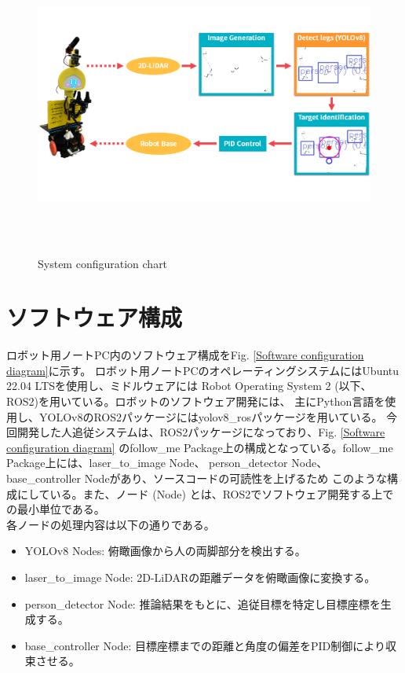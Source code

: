 \begin{figure}[h]
    \begin{center}
    \includegraphics[height=100mm,clip]{figure/System-configration-chart.png}
    \caption{System configuration chart}
    \label{System configuration chart}
    \end{center}
\end{figure}

\section{ソフトウェア構成}
ロボット用ノートPC内のソフトウェア構成をFig. \ref{Software configuration diagram}に示す。
ロボット用ノートPCのオペレーティングシステムにはUbuntu 22.04 LTSを使用し、ミドルウェアには
Robot Operating System 2 (以下、ROS2)を用いている。ロボットのソフトウェア開発には、
主にPython言語を使用し、YOLOv8のROS2パッケージにはyolov8\_rosパッケージを用いている。
今回開発した人追従システムは、ROS2パッケージになっており、Fig. \ref{Software configuration diagram}
のfollow\_me Package上の構成となっている。follow\_me Package上には、laser\_to\_image Node、
person\_detector Node、base\_controller Nodeがあり、ソースコードの可読性を上げるため
このような構成にしている。また、ノード (Node) とは、ROS2でソフトウェア開発する上での最小単位である。\\ \indent
各ノードの処理内容は以下の通りである。

\begin{itemize}
    \item YOLOv8 Nodes: 俯瞰画像から人の両脚部分を検出する。
    \item laser\_to\_image Node: 2D-LiDARの距離データを俯瞰画像に変換する。
    \item person\_detector Node: 推論結果をもとに、追従目標を特定し目標座標を生成する。
    \item base\_controller Node: 目標座標までの距離と角度の偏差をPID制御により収束させる。
\end{itemize}

